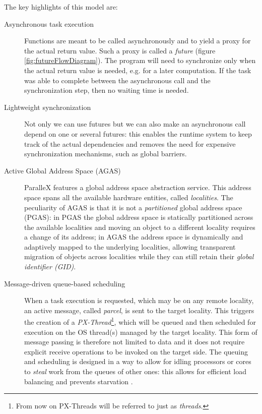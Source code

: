 The key highlights of this model are:
\begin{description}
	\item [Asynchronous task execution] Functions are meant to be called asynchronously and to yield a proxy for the actual return value. Such a proxy is called a \emph{future} (figure \ref{fig:futureFlowDiagram}). The program will need to synchronize only when the actual return value is needed, e.g. for a later computation. If the task was able to complete between the asynchronous call and the synchronization step, then no waiting time is needed.
	\item [Lightweight synchronization] Not only we can use futures but we can also make an asynchronous call depend on one or several futures: this enables the runtime system to keep track of the actual dependencies and removes the need for expensive synchronization mechanisms, such as global barriers.
	\item [Active Global Address Space (AGAS)] ParalleX features a global address space abstraction service. This address space spans all the available hardware entities, called \emph{localities}.
	The peculiarity of AGAS is that it is not a \emph{partitioned} global address space (PGAS): in PGAS the global address space is statically partitioned across the available localities and moving an object to a different locality requires a change of its address; in AGAS the address space is dynamically and adaptively mapped to the underlying localities, allowing transparent migration of objects across localities while they can still retain their \emph{global identifier (GID)}.
	\item [Message-driven queue-based scheduling] When a task execution is requested, which may be on any remote locality, an active message, called \emph{parcel}, is sent to the target locality. This triggers the creation of a \emph{PX-Thread}\footnote{From now on PX-Threads will be referred to just as \emph{threads}.}, which will be queued and then scheduled for execution on the OS thread(s) managed by the target locality. This form of message passing is therefore not limited to data and it does not require explicit receive operations to be invoked on the target side. The queuing and scheduling is designed in a way to allow for idling processors or cores to \emph{steal} work from the queues of other ones: this allows for efficient load balancing and prevents starvation
	.
\end{description}
